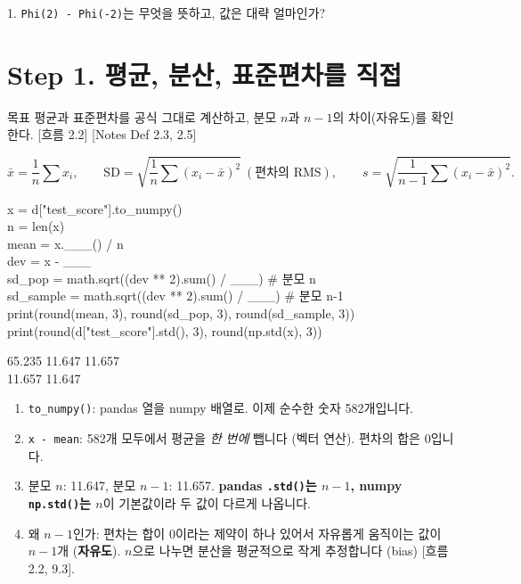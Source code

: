 \documentclass[11pt,a4paper]{article}
\newcommand{\term}[1]{\textbf{#1}}
\newcommand{\code}[1]{\texttt{#1}}
\newcommand{\Wc}[1]{{\scriptsize\textsf{\color{blue!60!black}[흐름 #1]}}}
\newcommand{\Nc}[1]{{\scriptsize\textsf{\color{violet!70!black}[Notes #1]}}}
\begin{document}
\begin{qbox}
1. \code{Phi(2) - Phi(-2)}는 무엇을 뜻하고, 값은 대략 얼마인가?
\end{qbox}

\section{Step 1. 평균, 분산, 표준편차를 직접}
\begin{goalbox}{목표}
평균과 표준편차를 공식 그대로 계산하고, 분모 $n$과 $n-1$의 차이(자유도)를 확인한다. \Wc{2.2} \Nc{Def 2.3, 2.5}
\end{goalbox}

\[
\bar x=\frac1n\sum x_i,\qquad \text{SD}=\sqrt{\frac1n\sum(x_i-\bar x)^2}\ (\text{편차의 RMS}),\qquad s=\sqrt{\frac1{n-1}\sum(x_i-\bar x)^2}.
\]

\begin{codebox}
x = d["test\_score"].to\_numpy()\\
n = len(x)\\
mean = x.\_\_\_() / n\\
dev = x - \_\_\_\\
sd\_pop = math.sqrt((dev ** 2).sum() / \_\_\_) \hfill \# 분모 n\\
sd\_sample = math.sqrt((dev ** 2).sum() / \_\_\_) \hfill \# 분모 n-1\\
print(round(mean, 3), round(sd\_pop, 3), round(sd\_sample, 3))\\
print(round(d["test\_score"].std(), 3), round(np.std(x), 3))
\end{codebox}
\begin{outbox}
65.235 11.647 11.657\\
11.657 11.647
\end{outbox}

\begin{howbox}
\begin{enumerate}
\item \code{to\_numpy()}: pandas 열을 numpy 배열로. 이제 순수한 숫자 582개입니다.
\item \code{x - mean}: 582개 모두에서 평균을 \emph{한 번에} 뺍니다 (벡터 연산). 편차의 합은 0입니다.
\item 분모 $n$: 11.647, 분모 $n-1$: 11.657. \textbf{pandas \code{.std()}는 $n-1$, numpy \code{np.std()}는 $n$}이 기본값이라 두 값이 다르게 나옵니다.
\item 왜 $n-1$인가: 편차는 합이 0이라는 제약이 하나 있어서 자유롭게 움직이는 값이 $n-1$개 (\term{자유도}). $n$으로 나누면 분산을 평균적으로 작게 추정합니다 (bias) \Wc{2.2, 9.3}.
\end{enumerate}
\end{howbox}
\end{document}
